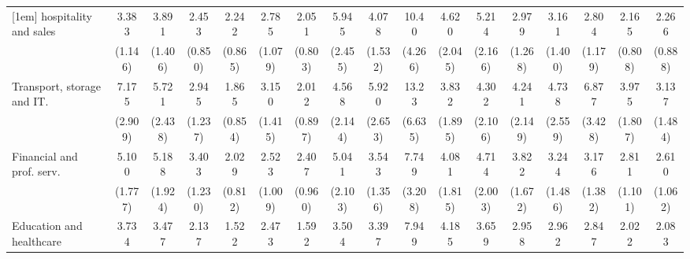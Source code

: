 {\begin{tabular}{l*{16}{c}}
[1em]
hospitality and sales&       3.383\sym{***}&       3.891\sym{***}&       2.453\sym{**} &       2.242\sym{*}  &       2.785\sym{**} &       2.051         &       5.945\sym{***}&       4.078\sym{***}&       10.40\sym{***}&       4.620\sym{***}&       5.214\sym{***}&       2.979\sym{*}  &       3.161\sym{**} &       2.804\sym{*}  &       2.165\sym{*}  &       2.266\sym{*}  \\
                    &     (1.146)         &     (1.406)         &     (0.850)         &     (0.865)         &     (1.079)         &     (0.803)         &     (2.455)         &     (1.532)         &     (4.266)         &     (2.045)         &     (2.166)         &     (1.268)         &     (1.400)         &     (1.179)         &     (0.808)         &     (0.888)         \\
[1em]
Transport, storage and IT.&       7.175\sym{***}&       5.721\sym{***}&       2.945\sym{*}  &       1.865         &       3.150\sym{*}  &       2.012         &       4.568\sym{**} &       5.920\sym{***}&       13.23\sym{***}&       3.832\sym{**} &       4.302\sym{**} &       4.241\sym{**} &       4.738\sym{**} &       6.877\sym{***}&       3.975\sym{**} &       3.137\sym{*}  \\
                    &     (2.909)         &     (2.438)         &     (1.237)         &     (0.854)         &     (1.415)         &     (0.897)         &     (2.144)         &     (2.653)         &     (6.635)         &     (1.895)         &     (2.106)         &     (2.149)         &     (2.559)         &     (3.428)         &     (1.807)         &     (1.484)         \\
[1em]
Financial and prof. serv.&       5.100\sym{***}&       5.188\sym{***}&       3.403\sym{***}&       2.029         &       2.523\sym{*}  &       2.407\sym{*}  &       5.041\sym{***}&       3.543\sym{***}&       7.749\sym{***}&       4.081\sym{**} &       4.714\sym{***}&       3.822\sym{**} &       3.244\sym{*}  &       3.176\sym{**} &       2.811\sym{**} &       2.610\sym{*}  \\
                    &     (1.777)         &     (1.924)         &     (1.230)         &     (0.812)         &     (1.009)         &     (0.960)         &     (2.103)         &     (1.356)         &     (3.208)         &     (1.815)         &     (2.003)         &     (1.672)         &     (1.486)         &     (1.382)         &     (1.101)         &     (1.062)         \\
[1em]
Education and healthcare&       3.734\sym{***}&       3.477\sym{***}&       2.137\sym{*}  &       1.522         &       2.473\sym{*}  &       1.592         &       3.504\sym{**} &       3.397\sym{**} &       7.949\sym{***}&       4.185\sym{**} &       3.659\sym{**} &       2.958\sym{*}  &       2.962\sym{*}  &       2.847\sym{*}  &       2.022         &       2.083         \\

\end{tabular}}
